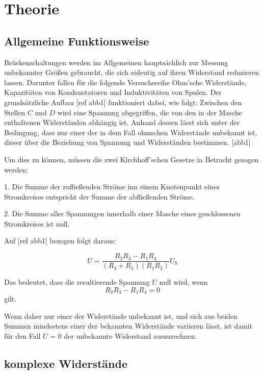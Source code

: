 \section{Theorie}
\label{sec:Theorie}

\subsection{Allgemeine Funktionsweise}

Brückenschaltungen werden im Allgemeinen hauptsächlich zur Messung unbekannter Größen 
gebraucht, die sich eideutig auf ihren Widerstand reduzieren lassen. Darunter fallen für
die folgende Versuchsreihe Ohm'sche Widerstände, Kapazitäten von Kondenstatoren und 
Induktivitäten von Spulen. Der grundsätzliche Aufbau [ref abb1] funktioniert dabei, wie folgt:
Zwischen den Stellen $C$ und $D$ wird eine Spannung abgegriffen, die von den in der Masche 
enthaltenen Widerständen abhängig ist. Anhand dessen lässt sich unter der Bedingung, dass 
nur einer der in dem Fall ohmschen Widerstände unbekannt ist, dieser über die Beziehung
von Spannung und Widerständen bestimmen. 
[abb1]

Um dies zu können, müssen die zwei Kirchhoff'schen Gesetze in Betracht gezogen werden:

1.  Die Summe der zufließenden Ströme inn einem Knotenpunkt eines Stromkreises entspricht
    der Summe der abfließenden Ströme.

2.  Die Summe aller Spannungen innerhalb einer Masche eines geschlossenen Stromkreises
    ist null.

Auf [ref abb1] bezogen folgt daraus:

\begin{equation}
    U = \frac{{R_2}{R_3}-{R_1}{R_4}}{({R_3}+{R_4})({R_1}{R_2})}U_{\text{S}} 
\end{equation}

Das bedeutet, dass die resultierende Spannung $U$ null wird, wenn 
\begin{equation}
    R_2 R_3 - R_1 R_4 = 0
\end{equation}
gilt.

Wenn daher nur einer der Widerstände unbekannt ist, und sich aus beiden Summen mindestens einer
der bekannten Widerstände variieren lässt, ist damit für den Fall $U$ = 0 der unbekannte Widerstand
auszurechnen.

\subsection{komplexe Widerstände}

